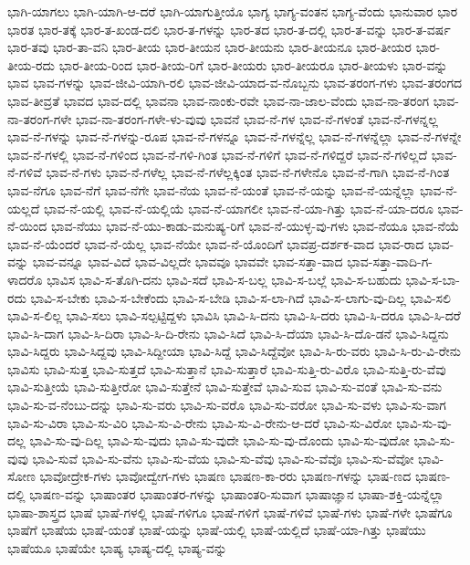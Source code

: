 {ಭಾಗಿ-ಯಾಗಲು
ಭಾಗಿ-ಯಾಗಿ-ಆ-ದರೆ
ಭಾಗಿ-ಯಾಗುತ್ತೀಯೊ
ಭಾಗ್ಯ
ಭಾಗ್ಯ-ವಂತನ
ಭಾಗ್ಯ-ವೆಂದು
ಭಾನುವಾರ
ಭಾರ
ಭಾರತ
ಭಾರ-ತಕ್ಕೆ
ಭಾರ-ತ-ಖಂಡ-ದಲಿ
ಭಾರ-ತ-ಗಳನ್ನು
ಭಾರ-ತದ
ಭಾರ-ತ-ದಲ್ಲಿ
ಭಾರ-ತ-ವನ್ನು
ಭಾರ-ತ-ವರ್ಷ
ಭಾರ-ತವು
ಭಾರ-ತಾ-ವನಿ
ಭಾರ-ತೀಯ
ಭಾರ-ತೀಯನ
ಭಾರ-ತೀಯನು
ಭಾರ-ತೀಯನೂ
ಭಾರ-ತೀಯರ
ಭಾರ-ತೀಯ-ರದು
ಭಾರ-ತೀಯ-ರಿಂದ
ಭಾರ-ತೀಯ-ರಿಗೆ
ಭಾರ-ತೀಯರು
ಭಾರ-ತೀಯರೂ
ಭಾರ-ತೀಯಳು
ಭಾರ-ವನ್ನು
ಭಾವ
ಭಾವ-ಗಳನ್ನು
ಭಾವ-ಜೀವಿ-ಯಾಗಿ-ರಲಿ
ಭಾವ-ಜೀವಿ-ಯಾದ-ವ-ನೊಬ್ಬನು
ಭಾವ-ತರಂಗ-ಗಳು
ಭಾವ-ತರಂಗದ
ಭಾವ-ತೀವ್ರತೆ
ಭಾವದ
ಭಾವ-ದಲ್ಲಿ
ಭಾವನಾ
ಭಾವ-ನಾಂಕು-ರವೇ
ಭಾವ-ನಾ-ಜಾಲ-ವೆಂದು
ಭಾವ-ನಾ-ತರಂಗ
ಭಾವ-ನಾ-ತರಂಗ-ಗಳೇ
ಭಾವ-ನಾ-ತರಂಗ-ಗಳೇ-ಳು-ವುವು
ಭಾವನೆ
ಭಾವ-ನೆ-ಗಳ
ಭಾವ-ನೆ-ಗಳಂತೆ
ಭಾವ-ನೆ-ಗಳನ್ನಲ್ಲ
ಭಾವ-ನೆ-ಗಳನ್ನು
ಭಾವ-ನೆ-ಗಳನ್ನು-ರೂಪ
ಭಾವ-ನೆ-ಗಳನ್ನೂ
ಭಾವ-ನೆ-ಗಳನ್ನೆಲ್ಲ
ಭಾವ-ನೆ-ಗಳನ್ನೆಲ್ಲಾ
ಭಾವ-ನೆ-ಗಳನ್ನೇ
ಭಾವ-ನೆ-ಗಳಲ್ಲಿ
ಭಾವ-ನೆ-ಗಳಿಂದ
ಭಾವ-ನೆ-ಗಳಿ-ಗಿಂತ
ಭಾವ-ನೆ-ಗಳಿಗೆ
ಭಾವ-ನೆ-ಗಳಿದ್ದರೆ
ಭಾವ-ನೆ-ಗಳಿಲ್ಲದೆ
ಭಾವ-ನೆ-ಗಳಿವೆ
ಭಾವ-ನೆ-ಗಳು
ಭಾವ-ನೆ-ಗಳೆಲ್ಲ
ಭಾವ-ನೆ-ಗಳೆಲ್ಲಕ್ಕಿಂತ
ಭಾವ-ನೆ-ಗಳೇನೊ
ಭಾವ-ನೆ-ಗಾಗಿ
ಭಾವ-ನೆ-ಗಿಂತ
ಭಾವ-ನೆಗೂ
ಭಾವ-ನೆಗೆ
ಭಾವ-ನೆಗೇ
ಭಾವ-ನೆಯ
ಭಾವ-ನೆ-ಯಂತೆ
ಭಾವ-ನೆ-ಯನ್ನು
ಭಾವ-ನೆ-ಯನ್ನೆಲ್ಲಾ
ಭಾವ-ನೆ-ಯಲ್ಲದೆ
ಭಾವ-ನೆ-ಯಲ್ಲಿ
ಭಾವ-ನೆ-ಯಲ್ಲಿಯೆ
ಭಾವ-ನೆ-ಯಾಗಲೀ
ಭಾವ-ನೆ-ಯಾ-ಗಿತ್ತು
ಭಾವ-ನೆ-ಯಾ-ದರೂ
ಭಾವ-ನೆ-ಯಿಂದ
ಭಾವ-ನೆಯು
ಭಾವ-ನೆ-ಯು-ಕಾಡು-ಮನುಷ್ಯ-ರಿಗೆ
ಭಾವ-ನೆ-ಯುಳ್ಳ-ವು-ಗಳು
ಭಾವ-ನೆಯೂ
ಭಾವ-ನೆಯೆ
ಭಾವ-ನೆ-ಯೆಂದರೆ
ಭಾವ-ನೆ-ಯೆಲ್ಲ
ಭಾವ-ನೆಯೇ
ಭಾವ-ನೆ-ಯೊಂದಿಗೆ
ಭಾವಪ್ರ-ದರ್ಶಕ-ವಾದ
ಭಾವ-ರಾದ
ಭಾವ-ವನ್ನು
ಭಾವ-ವನ್ನೂ
ಭಾವ-ವಿದೆ
ಭಾವ-ವಿಲ್ಲದೇ
ಭಾವವೂ
ಭಾವವೇ
ಭಾವ-ಸತ್ತಾ-ವಾದ
ಭಾವ-ಸತ್ತಾ-ವಾದಿ-ಗ-ಳಾದರೊ
ಭಾವಿಸ
ಭಾವಿ-ಸ-ತೊಗಿ-ದನು
ಭಾವಿ-ಸದೆ
ಭಾವಿ-ಸ-ಬಲ್ಲ
ಭಾವಿ-ಸ-ಬಲ್ಲೆ
ಭಾವಿ-ಸ-ಬಹುದು
ಭಾವಿ-ಸ-ಬಾ-ರದು
ಭಾವಿ-ಸ-ಬೇಕು
ಭಾವಿ-ಸ-ಬೇಕೆಂದು
ಭಾವಿ-ಸ-ಬೇಡಿ
ಭಾವಿ-ಸ-ಲಾ-ಗಿದೆ
ಭಾವಿ-ಸ-ಲಾಗು-ವು-ದಿಲ್ಲ
ಭಾವಿ-ಸಲಿ
ಭಾವಿ-ಸ-ಲಿಲ್ಲ
ಭಾವಿ-ಸಲು
ಭಾವಿ-ಸಲ್ಪಟ್ಟಿದ್ದಳು
ಭಾವಿಸಿ
ಭಾವಿ-ಸಿ-ದನು
ಭಾವಿ-ಸಿ-ದರು
ಭಾವಿ-ಸಿ-ದರೂ
ಭಾವಿ-ಸಿ-ದರೆ
ಭಾವಿ-ಸಿ-ದಾಗ
ಭಾವಿ-ಸಿ-ದಿರಾ
ಭಾವಿ-ಸಿ-ದಿ-ರೇನು
ಭಾವಿ-ಸಿದೆ
ಭಾವಿ-ಸಿ-ದೆಯಾ
ಭಾವಿ-ಸಿ-ದೊ-ಡನೆ
ಭಾವಿ-ಸಿದ್ದನು
ಭಾವಿ-ಸಿದ್ದರು
ಭಾವಿ-ಸಿದ್ದವು
ಭಾವಿ-ಸಿದ್ದೀಯಾ
ಭಾವಿ-ಸಿದ್ದೆ
ಭಾವಿ-ಸಿದ್ದೆವೋ
ಭಾವಿ-ಸಿ-ರು-ವರು
ಭಾವಿ-ಸಿ-ರು-ವಿ-ರೇನು
ಭಾವಿಸು
ಭಾವಿ-ಸುತ್ತ
ಭಾವಿ-ಸುತ್ತದೆ
ಭಾವಿ-ಸುತ್ತಾನೆ
ಭಾವಿ-ಸುತ್ತಾರೆ
ಭಾವಿ-ಸುತ್ತಿ-ರು-ವಿರೊ
ಭಾವಿ-ಸುತ್ತಿ-ರು-ವೆವು
ಭಾವಿ-ಸುತ್ತೀಯೆ
ಭಾವಿ-ಸುತ್ತೀರೋ
ಭಾವಿ-ಸುತ್ತೇನೆ
ಭಾವಿ-ಸುತ್ತೇವೆ
ಭಾವಿ-ಸುವ
ಭಾವಿ-ಸು-ವಂತೆ
ಭಾವಿ-ಸು-ವನು
ಭಾವಿ-ಸು-ವ-ನೆಂಬು-ದನ್ನು
ಭಾವಿ-ಸು-ವರು
ಭಾವಿ-ಸು-ವರೊ
ಭಾವಿ-ಸು-ವರೋ
ಭಾವಿ-ಸು-ವಳು
ಭಾವಿ-ಸು-ವಾಗ
ಭಾವಿ-ಸು-ವಿರಾ
ಭಾವಿ-ಸು-ವಿರಿ
ಭಾವಿ-ಸು-ವಿ-ರೇನು
ಭಾವಿ-ಸು-ವಿ-ರೇನು-ಆ-ದರೆ
ಭಾವಿ-ಸು-ವಿರೋ
ಭಾವಿ-ಸು-ವು-ದಲ್ಲ
ಭಾವಿ-ಸು-ವು-ದಿಲ್ಲ
ಭಾವಿ-ಸು-ವುದು
ಭಾವಿ-ಸು-ವುದೇ
ಭಾವಿ-ಸು-ವು-ದೊಂದು
ಭಾವಿ-ಸು-ವುದೋ
ಭಾವಿ-ಸು-ವುವು
ಭಾವಿ-ಸುವೆ
ಭಾವಿ-ಸು-ವೆನು
ಭಾವಿ-ಸು-ವೆಯ
ಭಾವಿ-ಸು-ವೆವು
ಭಾವಿ-ಸು-ವೆವೊ
ಭಾವಿ-ಸು-ವೆವೋ
ಭಾವಿ-ಸೋಣ
ಭಾವೋದ್ರೇಕ-ಗಳು
ಭಾವೋದ್ವೇಗ-ಗಳು
ಭಾಷಣ
ಭಾಷಣ-ಕಾ-ರರು
ಭಾಷಣ-ಗಳನ್ನು
ಭಾಷ-ಣದ
ಭಾಷಣ-ದಲ್ಲಿ
ಭಾಷಣ-ವನ್ನು
ಭಾಷಾಂತರ
ಭಾಷಾಂತರ-ಗಳನ್ನು
ಭಾಷಾಂತರಿ-ಸುವಾಗ
ಭಾಷಾಜ್ಞಾನ
ಭಾಷಾ-ಶಕ್ತಿ-ಯನ್ನೆಲ್ಲಾ
ಭಾಷಾ-ಶಾಸ್ತ್ರದ
ಭಾಷೆ
ಭಾಷೆ-ಗಳಲ್ಲಿ
ಭಾಷೆ-ಗಳಿಗೂ
ಭಾಷೆ-ಗಳಿಗೆ
ಭಾಷೆ-ಗಳಿವೆ
ಭಾಷೆ-ಗಳು
ಭಾಷೆ-ಗಳೇ
ಭಾಷೆಗೂ
ಭಾಷೆಗೆ
ಭಾಷೆಯ
ಭಾಷೆ-ಯಂತೆ
ಭಾಷೆ-ಯನ್ನು
ಭಾಷೆ-ಯಲ್ಲಿ
ಭಾಷೆ-ಯಲ್ಲಿದೆ
ಭಾಷೆ-ಯಾ-ಗಿತ್ತು
ಭಾಷೆಯು
ಭಾಷೆಯೂ
ಭಾಷೆಯೇ
ಭಾಷ್ಯ
ಭಾಷ್ಯ-ದಲ್ಲಿ
ಭಾಷ್ಯ-ವನ್ನು
}
